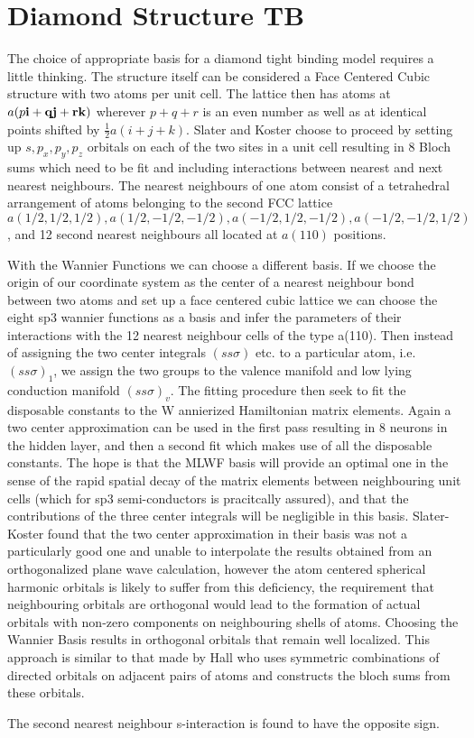 \section{Diamond Structure TB}
The choice of appropriate basis for a diamond tight binding model requires a little thinking.
The structure itself can be considered a Face Centered Cubic structure with two atoms per unit cell.
The lattice then has atoms at $a(p\bf{i} + q\bf{j} + r\bf{k})$ wherever $p+q+r$ is an even number
as well as at identical points shifted by $\frac{1}{2}a(i+j+k)$. Slater and Koster choose to proceed
by setting up $s,p_{x},p_{y},p_{z}$ orbitals on each of the two sites in a unit cell resulting in 8 
Bloch sums which need to be fit and including interactions between nearest and next nearest neighbours.
The nearest neighbours of one atom consist of a tetrahedral arrangement of atoms belonging to the 
second FCC lattice $a(1/2,1/2,1/2), a(1/2,-1/2,-1/2), a(-1/2,1/2,-1/2), a(-1/2,-1/2,1/2)$,
and 12 second nearest neighbours all located at $a(110)$ positions.

With the Wannier Functions we can choose a different basis. If we choose the origin of our coordinate
system as the center of a nearest neighbour bond between two atoms and set up a face centered cubic lattice
we can choose the eight sp3 wannier functions as a basis and infer the parameters
of their interactions with the 12 nearest neighbour cells of the type a(110). Then instead
of assigning the two center integrals $(ss\sigma)$ etc. to a particular atom, 
i.e. $(ss\sigma)_1$, we assign the two groups to the valence manifold and low lying conduction manifold 
$(ss\sigma)_{v}$. The fitting procedure then seek to fit the disposable constants to the W
annierized Hamiltonian matrix elements. Again a two center approximation can be used in the first pass
resulting in 8 neurons in the hidden layer, and then a second fit which makes use of 
all the disposable constants. The hope is that the MLWF basis will provide an optimal one in the
sense of the rapid spatial decay of the matrix elements between neighbouring unit cells 
(which for sp3 semi-conductors is pracitcally assured), and that the contributions of the three center
integrals will be negligible in this basis. Slater-Koster found that the two center approximation in their
basis was not a particularly good one and unable to interpolate the results obtained
from an orthogonalized plane wave calculation, however the atom centered spherical harmonic orbitals is likely 
to suffer from this deficiency, the requirement that neighbouring orbitals are orthogonal would lead to 
the formation of actual orbitals with non-zero components on neighbouring shells of atoms. Choosing
the Wannier Basis results in orthogonal orbitals that remain well localized. This approach is similar to
that made by Hall \cite{hall52} who uses symmetric  combinations of directed orbitals
on adjacent pairs of atoms and constructs the bloch sums from these orbitals.

The second nearest neighbour s-interaction is found to have the opposite sign.
